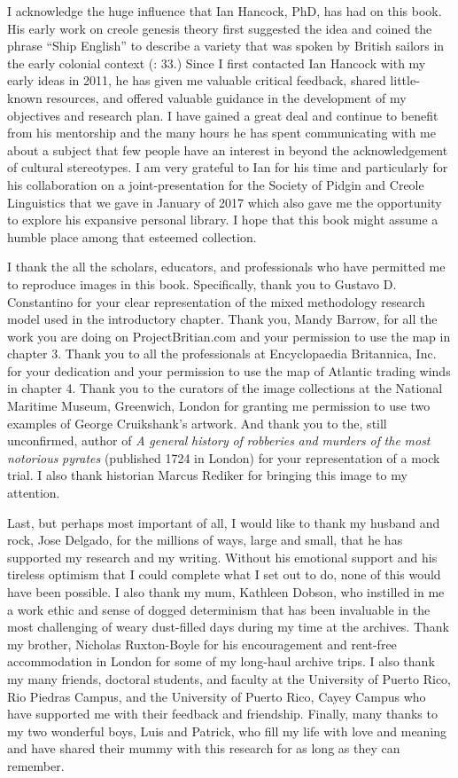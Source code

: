 I acknowledge the huge influence that Ian Hancock, PhD, has had on this book. His early work on creole genesis theory first suggested the idea and coined the phrase “Ship English” to describe a variety that was spoken by British sailors in the early colonial context (\citealt{Hancock1976}: 33.) Since I first contacted Ian Hancock with my early ideas in 2011, he has given me valuable critical feedback, shared little-known resources, and offered valuable guidance in the development of my objectives and research plan. I have gained a great deal and continue to benefit from his mentorship and the many hours he has spent communicating with me about a subject that few people have an interest in beyond the acknowledgement of cultural stereotypes. I am very grateful to Ian for his time and particularly for his collaboration on a joint-presentation for the Society of Pidgin and Creole Linguistics that we gave in January of 2017 which also gave me the opportunity to explore his expansive personal library. I hope that this book might assume a humble place among that esteemed collection. 

I thank the all the scholars, educators, and professionals who have permitted me to reproduce images in this book. Specifically, thank you to Gustavo D. Constantino for your clear representation of the mixed methodology research model used in the introductory chapter. Thank you, Mandy Barrow, for all the work you are doing on ProjectBritian.com and your permission to use the map in chapter 3. Thank you to all the professionals at Encyclopaedia Britannica, Inc. for your dedication and your permission to use the map of Atlantic trading winds in chapter 4. Thank you to the curators of the image collections at the National Maritime Museum, Greenwich, London for granting me permission to use two examples of George Cruikshank’s artwork. And thank you to the, still unconfirmed, author of \textit{A} \textit{general} \textit{history} \textit{of} \textit{robberies} \textit{and} \textit{murders} \textit{of} \textit{the} \textit{most} \textit{notorious} \textit{pyrates} (published 1724 in London) for your representation of a mock trial. I also thank historian Marcus Rediker for bringing this image to my attention. 

Last, but perhaps most important of all, I would like to thank my husband and rock, Jose Delgado, for the millions of ways, large and small, that he has supported my research and my writing.  Without his emotional support and his tireless optimism that I could complete what I set out to do, none of this would have been possible. I also thank my mum, Kathleen Dobson, who instilled in me a work ethic and sense of dogged determinism that has been invaluable in the most challenging of weary dust-filled days during my time at the archives. Thank my brother, Nicholas Ruxton-Boyle for his encouragement and rent-free accommodation in London for some of my long-haul archive trips. I also thank my many friends, doctoral students, and faculty at the University of Puerto Rico, Rio Piedras Campus, and the University of Puerto Rico, Cayey Campus who have supported me with their feedback and friendship. Finally, many thanks to my two wonderful boys, Luis and Patrick, who fill my life with love and meaning and have shared their mummy with this research for as long as they can remember. 
